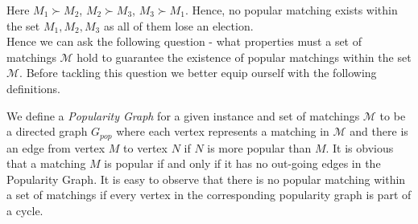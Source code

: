 \documentclass[a4paper,10pt]{article}
\theoremstyle{plain} %
\theoremstyle{plain} %
\begin{document}
\begin{center}
\end{center}

Here $M_1 \succ M_2$, $M_2 \succ M_3$, $M_3 \succ M_1$. Hence, no popular matching exists within the set $M_1, M_2, M_3$ as all of them lose an election.
\\

Hence we can ask the following question - what properties must a set of matchings $\mathcal{M}$ hold to guarantee the existence of popular matchings within the set $\mathcal{M}$. Before tackling this question we better equip ourself with the following definitions.

We define a \textit{Popularity Graph} for a given instance and set of matchings $\mathcal{M}$ to be a directed graph $G_{pop}$ where each vertex represents a matching in $\mathcal{M}$ and there is an edge from vertex $M$ to vertex $N$ if $N$ is more popular than $M$. It is obvious that a matching $M$ is popular if and only if it has no out-going edges in the Popularity Graph. It is easy to observe that there is no popular matching within a set of matchings if every vertex in the corresponding popularity graph is part of a cycle. 
\end{document}
